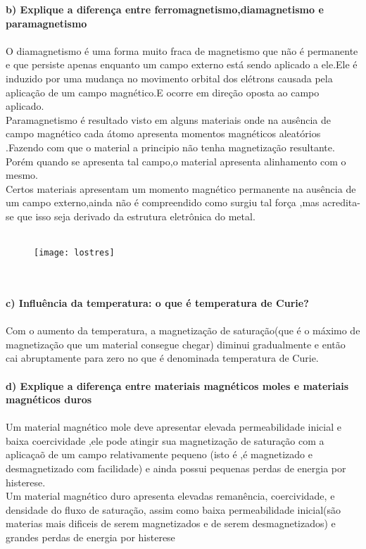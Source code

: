 \documentclass[11pt,a4paper]{article}
\begin{document}
\textbf{b) Explique a diferença entre ferromagnetismo,diamagnetismo e paramagnetismo}\\\\
O diamagnetismo é uma forma muito fraca de magnetismo que não é permanente e que persiste apenas enquanto um campo externo está sendo aplicado a ele.Ele é induzido por uma mudança no movimento orbital dos elétrons causada pela aplicação de um campo magnético.E ocorre em direção oposta ao campo aplicado.\\
Paramagnetismo é resultado visto em alguns materiais onde na ausência de campo magnético cada átomo apresenta momentos magnéticos aleatórios .Fazendo com que o material a principio não tenha magnetização resultante. Porém quando se apresenta tal campo,o material apresenta alinhamento com o mesmo.\\
Certos materiais apresentam um momento magnético permanente na ausência de um campo externo,ainda não é compreendido como surgiu tal força ,mas acredita-se que isso seja derivado da estrutura eletrônica do metal.
\\\\
\begin{figure}[!htb]
\texttt{[image: lostres]}\\
\end{figure}
\\\\
\textbf{c) Influência da temperatura: o que é temperatura de Curie?}\\\\
Com o aumento da temperatura, a magnetização de saturação(que é o máximo de magnetização que um material consegue chegar) diminui gradualmente e então cai abruptamente para zero no que é denominada temperatura de Curie.
\\\\
\textbf{d) Explique a diferença entre materiais magnéticos moles e materiais magnéticos duros}\\\\
Um material magnético mole deve apresentar  elevada permeabilidade inicial e baixa coercividade ,ele pode atingir sua magnetização de saturação com a aplicaçaõ de um campo relativamente pequeno (isto é ,é magnetizado e desmagnetizado com facilidade) e ainda possui pequenas perdas de energia por histerese.\\
Um material magnético duro apresenta elevadas remanência, coercividade, e densidade do fluxo de saturação, assim como baixa permeabilidade inicial(são materias mais dificeis de serem magnetizados e de serem desmagnetizados) e grandes perdas de energia por histerese\\
\end{document}
